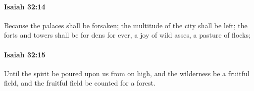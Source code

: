 		\paragraph{Isaiah 32:14} %
			\label{ISAIAH-32-14}

			Because the palaces shall be forsaken; the multitude of the city shall be left; the forts and towers shall be for dens for ever, a joy of wild asses, a pasture of flocks;


		\paragraph{Isaiah 32:15} %
			\label{ISAIAH-32-15}

			Until the spirit be poured upon us from on high, and the wilderness be a fruitful field, and the fruitful field be counted for a forest.


